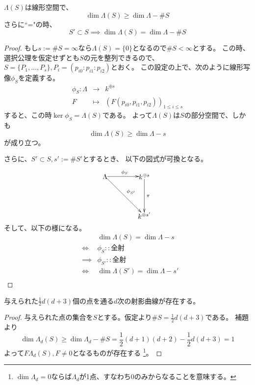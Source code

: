 \documentclass[a4paper]{jsarticle}
\begin{document}
    \begin{Lemma}
        $\Lambda(S)$は線形空間で、
        \[ \dim \Lambda(S) \geq \dim \Lambda - \#S \]
        さらに``="の時、
        \[ S' \subset S \implies \dim \Lambda(S) = \dim \Lambda - \#S \]
    \end{Lemma}
    \begin{proof}
        もし$s:=\#S=\infty$なら$\Lambda(S)=\{0\}$となるので$\#S<\infty$とする。
        この時、選択公理を仮定せずとも$S$の元を整列できるので、
        $S=\{ P_1, \dots, P_s \}, P_i=(p_{i0}: p_{i1}: p_{i2})$とおく。
        この設定の上で、次のように線形写像$\phi_S$を定義する。
        \begin{eqnarray*}
            \phi_S : \Lambda &\to& k^{\oplus s} \\
            F &\mapsto& (F(p_{i0}, p_{i1}, p_{i2}))_{1 \leq i \leq s}
        \end{eqnarray*}
        すると、この時$\operatorname{ker}\phi_S=\Lambda(S)$である。
        よって$\Lambda(S)$は$S$の部分空間で、しかも
        \[ \dim \Lambda(S) \geq \dim \Lambda - s \]
        が成り立つ。

        さらに、$S' \subset S, s':=\#S'$とするとき、
        以下の図式が可換となる。
        \[
            \begin{xy}
                (0,20) *{\Lambda}="la",
                (20,20) *{k^{\oplus s}}="ks",
                (20,0) *{k^{\oplus s'}}="ksd",
                \ar@{->}^{\phi_S} "la";"ks"
                \ar@{->}^{\pi} "ks";"ksd"
                \ar@{->}^{\phi_{S'}} "la";"ksd"
            \end{xy}
        \]
        そして、以下の様になる。
        \begin{eqnarray*}
            &{}& \dim \Lambda(S) = \dim \Lambda - s \\
            &\iff& \phi_S :: \mbox{全射} \\
            &\implies& \phi_{S'} :: \mbox{全射} \\
            &\iff& \dim \Lambda(S') = \dim \Lambda - s' \\
        \end{eqnarray*}
        
    \end{proof}

    \begin{Prop}
        与えられた$\frac{1}{2}d(d+3)$個の点を通る$d$次の射影曲線が存在する。
    \end{Prop}
    \begin{proof}
        与えられた点の集合を$S$とする。仮定より$\#S=\frac{1}{2}d(d+3)$である。
        補題より
        \[ \dim \Lambda_d(S) \geq \dim \Lambda_d - \#S=\frac{1}{2}(d+1)(d+2)-\frac{1}{2}d(d+3)=1 \]
        よって$F \Lambda_d(S), F \neq 0$となるものが存在する
        \footnote{$\dim \Lambda_d=0$ならば$\Lambda_d$が1点、すなわち0のみからなることを意味する。}。
        
    \end{proof}
\end{document}
